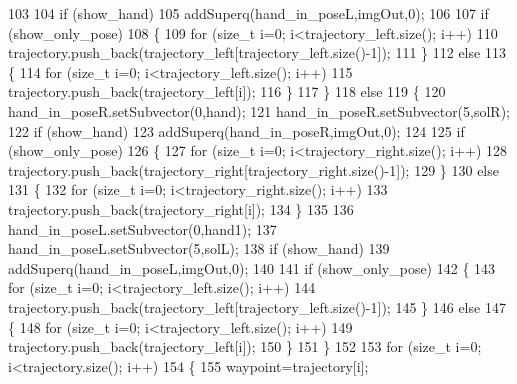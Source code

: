 \begin{DoxyCode}
103 
104             \textcolor{keywordflow}{if} (show_hand)               
105                 addSuperq(hand\_in\_poseL,imgOut,0);
106 
107             \textcolor{keywordflow}{if} (show_only_pose)
108             \{
109                 \textcolor{keywordflow}{for} (\textcolor{keywordtype}{size\_t} i=0; i<trajectory\_left.size(); i++)
110                     trajectory.push\_back(trajectory\_left[trajectory\_left.size()-1]);
111             \}
112             \textcolor{keywordflow}{else}
113             \{
114                 \textcolor{keywordflow}{for} (\textcolor{keywordtype}{size\_t} i=0; i<trajectory\_left.size(); i++)
115                     trajectory.push\_back(trajectory\_left[i]);
116             \}
117         \}
118         \textcolor{keywordflow}{else}
119         \{
120             hand\_in\_poseR.setSubvector(0,hand);
121             hand\_in\_poseR.setSubvector(5,solR);
122             \textcolor{keywordflow}{if} (show_hand)
123                 addSuperq(hand\_in\_poseR,imgOut,0);
124 
125             \textcolor{keywordflow}{if} (show_only_pose)
126             \{
127                 \textcolor{keywordflow}{for} (\textcolor{keywordtype}{size\_t} i=0; i<trajectory\_right.size(); i++)
128                     trajectory.push\_back(trajectory\_right[trajectory\_right.size()-1]);
129             \}
130             \textcolor{keywordflow}{else}
131             \{
132                 \textcolor{keywordflow}{for} (\textcolor{keywordtype}{size\_t} i=0; i<trajectory\_right.size(); i++)
133                     trajectory.push\_back(trajectory\_right[i]);
134             \}
135 
136             hand\_in\_poseL.setSubvector(0,hand1);
137             hand\_in\_poseL.setSubvector(5,solL);
138             \textcolor{keywordflow}{if} (show_hand)
139                 addSuperq(hand\_in\_poseL,imgOut,0);
140 
141             \textcolor{keywordflow}{if} (show_only_pose)
142             \{
143                 \textcolor{keywordflow}{for} (\textcolor{keywordtype}{size\_t} i=0; i<trajectory\_left.size(); i++)
144                     trajectory.push\_back(trajectory\_left[trajectory\_left.size()-1]);
145             \}
146             \textcolor{keywordflow}{else}
147             \{
148                 \textcolor{keywordflow}{for} (\textcolor{keywordtype}{size\_t} i=0; i<trajectory\_left.size(); i++)
149                     trajectory.push\_back(trajectory\_left[i]);
150             \}
151         \}
152 
153         \textcolor{keywordflow}{for} (\textcolor{keywordtype}{size\_t} i=0; i<trajectory.size(); i++)
154         \{
155             waypoint=trajectory[i];

\end{DoxyCode}
